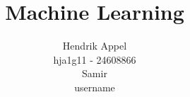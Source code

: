 \documentclass[a4paper, 11pt, twocolumn]{report}
\begin{document}
\lstset{language=Matlab, basicstyle=\small}
\title{Machine Learning}
\author{Hendrik Appel \\ hja1g11 - 24608866 \\ Samir \\ username}
\maketitle

\printbibliography
\end{document}
